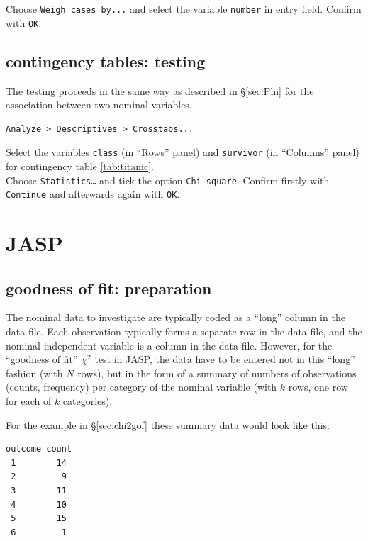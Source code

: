 \documentclass[
]{book}
\begin{document}
Choose \texttt{Weigh\ cases\ by...} and select the variable \texttt{number} in
entry field. Confirm with \texttt{OK}.

\hypertarget{contingency-tables-testing}{%
\subsection{contingency tables: testing}\label{contingency-tables-testing}}

The testing proceeds in the same way as described in
§\ref{sec:Phi} for
the association between two nominal variables.

\begin{verbatim}
Analyze > Descriptives > Crosstabs...
\end{verbatim}

Select the variables \texttt{class} (in ``Rows'' panel) and \texttt{survivor} (in
``Columns'' panel) for
contingency table \ref{tab:titanic}.\\
Choose \texttt{Statistics…} and tick the option \texttt{Chi-square}. Confirm firstly with
\texttt{Continue} and afterwards again with \texttt{OK}.

\hypertarget{jasp-15}{%
\section{JASP}\label{jasp-15}}

\hypertarget{goodness-of-fit-preparation-1}{%
\subsection{goodness of fit: preparation}\label{goodness-of-fit-preparation-1}}

The nominal data to investigate are typically coded as a ``long'' column in the data file. Each observation typically forms a separate row in the data file, and the nominal independent variable is a column in the data file. However, for the ``goodness of fit'' \(\chi^2\) test in JASP, the data have to be entered not in this ``long'' fashion (with \(N\) rows), but in the form of a summary of numbers of observations (counts, frequency) per category of the nominal variable (with \(k\) rows, one row for each of \(k\) categories).

For the example in §\ref{sec:chi2gof} these summary data would look like this:

\begin{verbatim}
outcome count
 1        14
 2         9
 3        11
 4        10
 5        15
 6         1
\end{verbatim}
\end{document}
